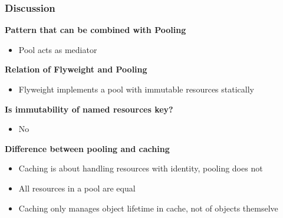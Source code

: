 \subsubsection{Discussion}
\textbf{Pattern that can be combined with Pooling}
\begin{itemize}
    \item Pool acts as mediator
\end{itemize}
\textbf{Relation of Flyweight and Pooling}
\begin{itemize}
    \item Flyweight implements a pool with immutable resources statically
\end{itemize}
\textbf{Is immutability of named resources key?}
\begin{itemize}
    \item No
\end{itemize}
\textbf{Difference between pooling and caching}
\begin{itemize}
    \item Caching is about handling resources with identity, pooling does not
    \item All resources in a pool are equal
    \item Caching only manages object lifetime in cache, not of objects themselve
\end{itemize}